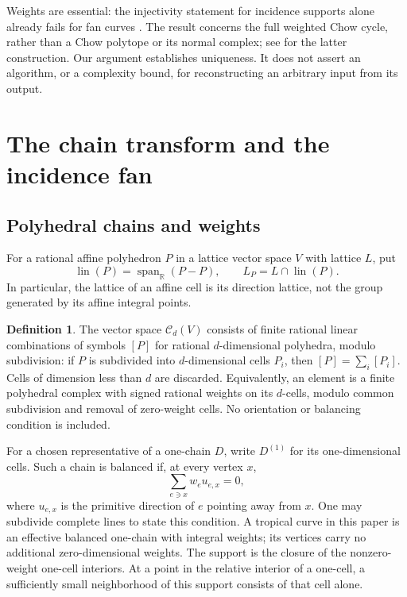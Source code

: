\documentclass[11pt]{article}
\theoremstyle{definition}
\newtheorem{definition}[theorem]{Definition}
\theoremstyle{remark}
\newcommand{\R}{\mathbb R}
\newcommand{\Ch}{\mathcal C}
\newcommand{\Span}{\operatorname{span}_{\R}}
\newcommand{\lin}{\operatorname{lin}}
\begin{document}
Weights are essential: the injectivity statement for incidence supports
alone already fails for fan curves
\cite[Example~3.5]{Tripoli}. The result concerns the full weighted Chow
cycle, rather than a Chow polytope or its normal complex; see
\cite{Fink} for the latter construction. Our argument establishes
uniqueness. It does not assert an algorithm, or a complexity bound, for
reconstructing an arbitrary input from its output.

\section{The chain transform and the incidence fan}\label{sec:transform}

\subsection{Polyhedral chains and weights}

For a rational affine polyhedron $P$ in a lattice vector space $V$ with
lattice $L$, put
\[
 \lin(P)=\Span(P-P),\qquad L_P=L\cap\lin(P).
\]
In particular, the lattice of an affine cell is its direction lattice,
not the group generated by its affine integral points.

\begin{definition}
The vector space $\Ch_d(V)$ consists of finite rational linear
combinations of symbols $[P]$ for rational $d$-dimensional polyhedra,
modulo subdivision: if $P$ is subdivided into $d$-dimensional cells $P_i$,
then $[P]=\sum_i[P_i]$. Cells of dimension less than $d$ are discarded.
Equivalently, an element is a finite polyhedral complex with signed
rational weights on its $d$-cells, modulo common subdivision and removal
of zero-weight cells. No orientation or balancing condition is included.
\end{definition}

For a chosen representative of a one-chain $D$, write $D^{(1)}$ for its
one-dimensional cells. Such a chain is balanced if, at every vertex $x$,
\[
 \sum_{e\ni x}w_e u_{e,x}=0,
\]
where $u_{e,x}$ is the primitive direction of $e$ pointing away from $x$.
One may subdivide complete lines to state this condition. A tropical
curve in this paper is an effective balanced one-chain with integral
weights; its vertices carry no additional zero-dimensional weights.
The support is the closure of the nonzero-weight one-cell interiors.
At a point in the relative interior of a one-cell, a sufficiently small
neighborhood of this support consists of that cell alone.
\end{document}
